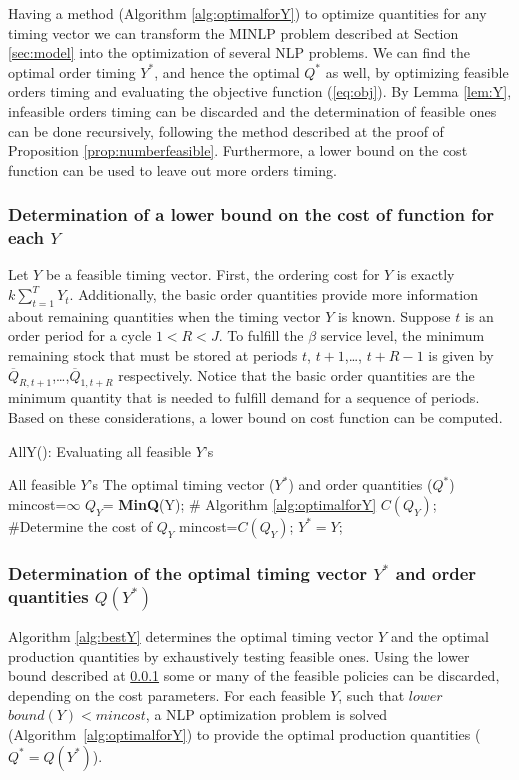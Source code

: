 Having a method (Algorithm \ref{alg:optimalforY}) to optimize quantities for any timing vector we can transform the MINLP problem described at Section \ref{sec:model} into the optimization of several NLP problems. We can find the optimal order timing $Y^*$, and hence the optimal $Q^*$ as well, by optimizing feasible  orders timing and evaluating the objective function (\ref{eq:obj}). By Lemma \ref{lem:Y}, infeasible  orders timing can be discarded and the determination of feasible ones can be done recursively, following the method described at the proof of Proposition \ref{prop:numberfeasible}. Furthermore, a lower bound on the cost function can be used to leave out more orders timing.

\subsubsection{Determination of a lower bound on the cost of function for each $Y$}
\label{sec:lowerbound}
Let $Y$ be a feasible timing vector. First, the ordering cost for $Y$ is exactly $k \sum\limits_{t=1}^{T}Y_t$. Additionally, the basic order quantities provide more information about remaining quantities when the timing vector $Y$ is known. Suppose $t$ is an order period for a cycle $1<R<J$.  To fulfill the $\beta$ service level, the minimum remaining stock that must be stored at periods $t$, $t+1$,\ldots, $t+R-1$ is given by  $\overline Q_{R,t+1}$,\ldots,$\overline Q_{1,t+R}$ respectively. Notice that the basic order quantities are the minimum quantity that is needed to fulfill demand for a sequence of periods. Based on these considerations, a lower bound on cost function can be computed.

\begin{algorithm}[!bt]
\caption{AllY(): Evaluating all feasible $Y$'s }
\label{alg:bestY}
\begin{algorithmic}[1]
 \REQUIRE All feasible $Y$'s
 \ENSURE The optimal timing vector ($Y^*$) and order quantities ($Q^*$)
 \medskip
\STATE mincost=$\infty$
  \label{bestY:line:LB}
\STATE $Q_Y$=  \textbf{MinQ}(Y);   \label{bestY:line:NLPsolver} \hfill \# Algorithm \ref{alg:optimalforY}
\STATE $C(Q_Y)$; \hfill \#Determine the cost of $Q_Y$
\STATE mincost=$C(Q_Y)$;
\STATE $Y^*=Y$;
\ENDIF
\ENDIF
\ENDFOR
\vskip 5pt
\end{algorithmic}
\end{algorithm}

\subsubsection{Determination of the optimal timing vector $Y^*$ and order quantities $Q(Y^*)$}
Algorithm \ref{alg:bestY} determines the optimal timing vector $Y$ and the optimal production quantities by exhaustively testing feasible ones. Using the lower bound described at \ref{sec:lowerbound} some or many of the feasible policies can be discarded, depending on the cost parameters. For each feasible $Y$, such that  $lower$ $bound(Y) < mincost$,  a NLP optimization problem is solved (Algorithm~\ref{alg:optimalforY}) to provide the  optimal production quantities ($Q^*=Q(Y^*)$).

